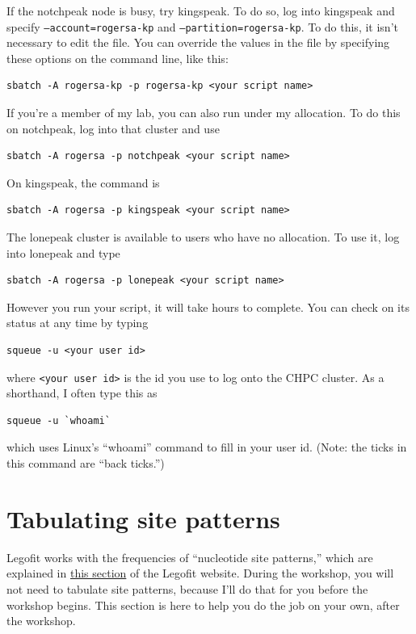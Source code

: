 \documentclass[11pt]{article}
\begin{document}
If the notchpeak node is busy, try kingspeak. To do so, log into
kingspeak and specify \texttt{--account=rogersa-kp} and
\texttt{--partition=rogersa-kp}. To do this, it isn't necessary to
edit the file. You can override the values in the file by specifying
these options on the command line, like this:
\begin{verbatim}
sbatch -A rogersa-kp -p rogersa-kp <your script name>
\end{verbatim}
If you're a member of my lab, you can also run under my allocation. To
do this on notchpeak, log into that cluster and use
\begin{verbatim}
sbatch -A rogersa -p notchpeak <your script name>
\end{verbatim}
On kingspeak, the command is
\begin{verbatim}
sbatch -A rogersa -p kingspeak <your script name>
\end{verbatim}
The lonepeak cluster is available to users who have no allocation. To
use it, log into lonepeak and type
\begin{verbatim}
sbatch -A rogersa -p lonepeak <your script name>
\end{verbatim}

However you run your script, it will take hours to complete. You can
check on its status at any time by typing
\begin{verbatim}
squeue -u <your user id>
\end{verbatim}
where \verb|<your user id>| is the id you use to log onto the CHPC cluster.
As a shorthand, I often type this as
\begin{verbatim}
squeue -u `whoami`
\end{verbatim}
which uses Linux's ``whoami'' command to fill in your user id. (Note:
the ticks in this command are ``back ticks.'')

\section{Tabulating site patterns}
\label{sec.tabulate}
Legofit works with the frequencies of ``nucleotide site patterns,''
which are explained in 
\href{http://alanrogers.github.io/legofit/html/index.html#sitepattern}{this
  section} of the Legofit website. During the workshop, you will not
need to tabulate site patterns, because I'll do that for you before
the workshop begins. This section is here to help you do the job on
your own, after the workshop.
\end{document}
